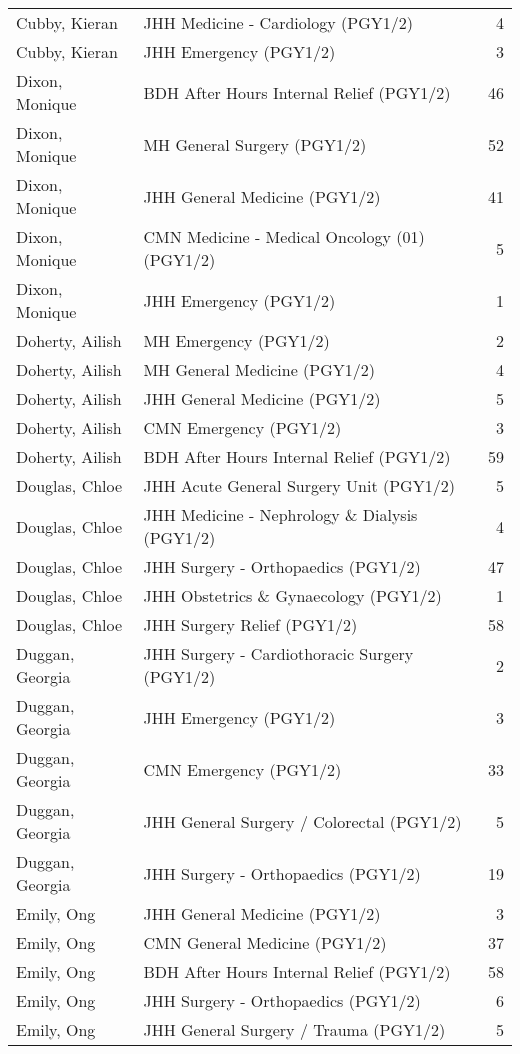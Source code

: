 \documentclass[
]{article}
\begin{document}
\begin{longtable}{llr}
Cubby, Kieran & JHH Medicine - Cardiology (PGY1/2) & 4 \\ 
Cubby, Kieran & JHH Emergency (PGY1/2) & 3 \\ 
Dixon, Monique & BDH After Hours Internal Relief (PGY1/2) & 46 \\ 
Dixon, Monique & MH General Surgery (PGY1/2) & 52 \\ 
Dixon, Monique & JHH General Medicine (PGY1/2) & 41 \\ 
Dixon, Monique & CMN Medicine - Medical Oncology (01) (PGY1/2) & 5 \\ 
Dixon, Monique & JHH Emergency (PGY1/2) & 1 \\ 
Doherty, Ailish & MH Emergency (PGY1/2) & 2 \\ 
Doherty, Ailish & MH General Medicine (PGY1/2) & 4 \\ 
Doherty, Ailish & JHH General Medicine (PGY1/2) & 5 \\ 
Doherty, Ailish & CMN Emergency (PGY1/2) & 3 \\ 
Doherty, Ailish & BDH After Hours Internal Relief (PGY1/2) & 59 \\ 
Douglas, Chloe & JHH Acute General Surgery Unit (PGY1/2) & 5 \\ 
Douglas, Chloe & JHH Medicine - Nephrology \& Dialysis (PGY1/2) & 4 \\ 
Douglas, Chloe & JHH Surgery - Orthopaedics (PGY1/2) & 47 \\ 
Douglas, Chloe & JHH Obstetrics \& Gynaecology (PGY1/2) & 1 \\ 
Douglas, Chloe & JHH Surgery Relief (PGY1/2) & 58 \\ 
Duggan, Georgia & JHH Surgery - Cardiothoracic Surgery (PGY1/2) & 2 \\ 
Duggan, Georgia & JHH Emergency (PGY1/2) & 3 \\ 
Duggan, Georgia & CMN Emergency (PGY1/2) & 33 \\ 
Duggan, Georgia & JHH General Surgery / Colorectal (PGY1/2) & 5 \\ 
Duggan, Georgia & JHH Surgery - Orthopaedics (PGY1/2) & 19 \\ 
Emily, Ong & JHH General Medicine (PGY1/2) & 3 \\ 
Emily, Ong & CMN General Medicine (PGY1/2) & 37 \\ 
Emily, Ong & BDH After Hours Internal Relief (PGY1/2) & 58 \\ 
Emily, Ong & JHH Surgery - Orthopaedics (PGY1/2) & 6 \\ 
Emily, Ong & JHH General Surgery / Trauma (PGY1/2) & 5 \\ 

\end{longtable}
\end{document}
